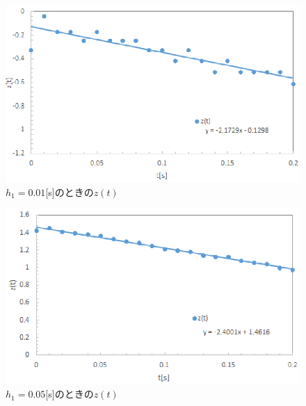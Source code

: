 \documentclass[11pt,a4paper]{jsarticle}
\begin{document}
\begin{figure}[htb]
 \begin{center}
  \includegraphics[scale = 1]{./picture/graph1_re.eps}
 \end{center}
 \caption{$h_1 = 0.01$[s]のときの$z(t)$}
\end{figure}

\begin{figure}[htb]
 \begin{center}
  \includegraphics[scale = 1]{./picture/graph2_re.eps}
 \end{center}
 \caption{$h_1 = 0.05$[s]のときの$z(t)$}
\end{figure}

\newpage
\thispagestyle{fancy}
\cfoot{}
\end{document}

